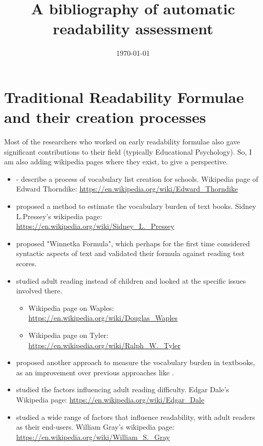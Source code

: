 \documentclass[a4paper,12pt]{report}
\title{A bibliography of automatic readability assessment}
\author	{}
\date{\today}
\begin{document}
\section{Traditional Readability Formulae and their creation processes}

Most of the researchers who worked on early readability formulae also gave significant contributions to their field (typically Educational Psychology). So, I am also adding wikipedia pages where they exist, to give a perspective.

\begin{itemize}\itemsep1ex
\item \cite{Thorndike-21} - describe a process of vocabulary list creation for schools. Wikipedia page of Edward Thorndike: \url{https://en.wikipedia.org/wiki/Edward_Thorndike}

\item \cite{Lively.Pressey-23} proposed a method to estimate the vocabulary burden of text books. Sidney L.Pressey's wikipedia page: \url{https://en.wikipedia.org/wiki/Sidney_L._Pressey}

\item \cite{Vogel.Washburne-28} proposed "Winnetka Formula", which perhaps for the first time considered syntactic aspects of text and validated their formula against reading test scores.

\item \cite{Waples.Tyler-31} studied adult reading instead of children and looked at the specific issues involved there.
   \begin{itemize}
    \item Wikipedia page on Waples: \url{https://en.wikipedia.org/wiki/Douglas_Waples}
    \item Wikipedia page on Tyler: \url{https://en.wikipedia.org/wiki/Ralph_W._Tyler}
   \end{itemize}

\item \cite{Patty.Painter-31} proposed another approach to measure the vocabulary burden in textbooks, as an improvement over previous approaches like \cite{Lively.Pressey-23}. 

\item \cite{Dale.Tyler-34} studied the factors influencing adult reading difficulty. Edgar Dale's Wikipedia page: \url{https://en.wikipedia.org/wiki/Edgar_Dale}

\item \cite{Gray.Leary-35} studied a wide range of factors that influence readability, with adult readers as their end-users. William Gray's wikipedia page: \url{https://en.wikipedia.org/wiki/William_S._Gray}


\end{itemize}
\end{document}
